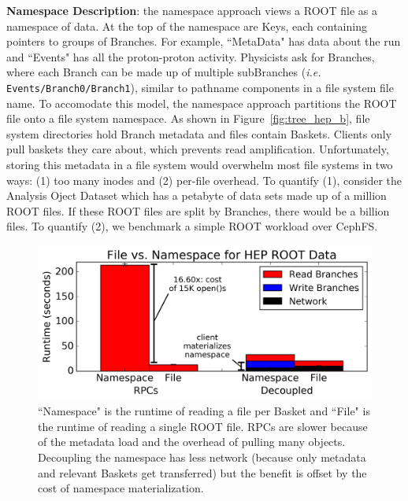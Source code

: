 \textbf{Namespace Description}: the namespace approach views a ROOT file as a
namespace of data. At the top of the namespace are Keys, each containing
pointers to groups of Branches. For example, ``MetaData" has data about the run
and ``Events" has all the proton-proton activity. Physicists ask for Branches,
where each Branch can be made up of multiple subBranches ({\it i.e.}
\texttt{Events/Branch0/Branch1}), similar to pathname components in a file
system file name.  To accomodate this model, the namespace approach partitions
the ROOT file onto a file system namespace.  As shown in
Figure~\ref{fig:tree_hep_b}, file system directories hold Branch metadata and
files contain Baskets. Clients only pull baskets they care about, which
prevents read amplification.  Unfortunately, storing this metadata in a file
system would overwhelm most file systems in two ways: (1) too many inodes and
(2) per-file overhead.  To quantify (1), consider the Analysis Oject Dataset
which has a petabyte of data sets made up of a million ROOT files. If these
ROOT files are split by Branches, there would be a billion files. To quantify
(2), we benchmark a simple ROOT workload over CephFS.



\begin{figure}[tb]
\centering
  \includegraphics[width=1\linewidth]{figures/hep_runtime.png}
  \caption{ ``Namespace" is the runtime of reading a file per Basket and
``File" is the runtime of reading a single ROOT file. RPCs are slower because
of the metadata load and the overhead of pulling many objects.  Decoupling the
namespace has less network (because only metadata and relevant Baskets get
transferred) but the benefit is offset by the cost of namespace
materialization.}\label{fig:hep_runtime}
\end{figure}

